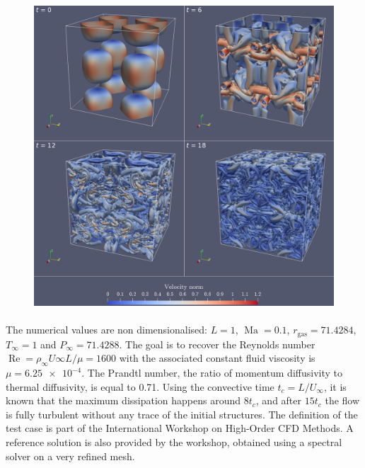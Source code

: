       \begin{figure}
        \centering
        \includegraphics[width=\textwidth]{figures/tgv_fields.png}
        \caption{}
        \label{fig:tgv_fields}
      \end{figure}

      \paragraph{}
      The numerical values are non dimensionalised: $L = 1$, $\operatorname{Ma} = 0.1$, $r_\textrm{gas} = 71.4284$, $T_\infty = 1$ and $P_\infty = 71.4288$.
      The goal is to recover the Reynolds number $\operatorname{Re} = \rho_\infty U\infty L / \mu = 1600$ with the associated constant fluid viscosity is $\mu = \num{6.25e-4}$.
      The Prandtl number, the ratio of momentum diffusivity to thermal diffusivity, is equal to 0.71.
      Using the convective time $t_c = L / U_\infty$, it is known that the maximum dissipation happens around $8 t_c$, and after $15 t_c$ the flow is fully turbulent without any trace of the initial structures.
      The definition of the test case is part of the International Workshop on High-Order CFD Methods.
      A reference solution is also provided by the workshop, obtained using a spectral solver on a very refined mesh.

